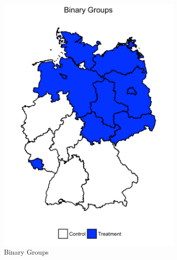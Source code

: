 \documentclass[a4paper]{article}
\begin{document}
{\begin{figure}
\begin{subfigure}[h]{0.33\linewidth}
\includegraphics[width=\textwidth]{q6/plot-factor.pdf}
\caption{Binary Groups}
\end{subfigure}
\hfill
\begin{subfigure}[h]{0.33\linewidth}

\end{subfigure}
\end{figure}}
\end{document}

